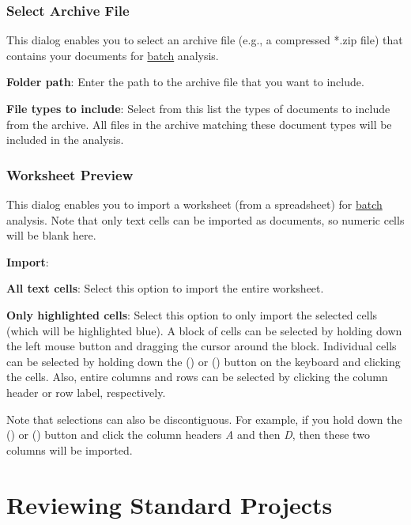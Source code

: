\documentclass[
]{book}
\theoremstyle{definition}
\theoremstyle{definition}
\theoremstyle{definition}
\theoremstyle{definition}
\theoremstyle{remark}
\begin{document}
\hypertarget{select-archive}{%
\subsection*{Select Archive File}\label{select-archive}}

This dialog enables you to select an archive file (e.g., a compressed *.zip file) that contains your documents for \protect\hyperlink{creating-batch-project}{batch} analysis.

\textbf{Folder path}: Enter the path to the archive file that you want to include.

\textbf{File types to include}: Select from this list the types of documents to include from the archive. All files in the archive matching these document types will be included in the analysis.

\hypertarget{worksheet-preview}{%
\subsection*{Worksheet Preview}\label{worksheet-preview}}

This dialog enables you to import a worksheet (from a spreadsheet) for \protect\hyperlink{creating-batch-project}{batch} analysis. Note that only text cells can be imported as documents, so numeric cells will be blank here.

\textbf{Import}:

\textbf{All text cells}: Select this option to import the entire worksheet.

\textbf{Only highlighted cells}: Select this option to only import the selected cells (which will be highlighted blue). A block of cells can be selected by holding down the left mouse button and dragging the cursor around the block. Individual cells can be selected by holding down the  (\faWindows) or \keys{\cmd} (\faApple) button on the keyboard and clicking the cells. Also, entire columns and rows can be selected by clicking the column header or row label, respectively.

Note that selections can also be discontiguous. For example, if you hold down the  (\faWindows) or \keys{\cmd} (\faApple) button and click the column headers \emph{A} and then \emph{D}, then these two columns will be imported.

\hypertarget{reviewing-standard-projects}{%
\chapter{Reviewing Standard Projects}\label{reviewing-standard-projects}}
\end{document}
